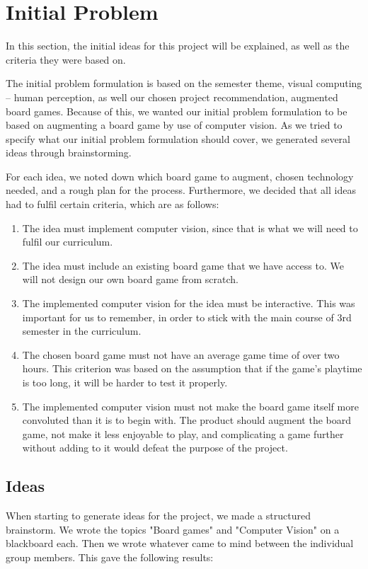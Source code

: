 \chapter{Initial Problem}\label{ch:iniprob}
In this section, the initial ideas for this project will be explained, as well as the criteria they were based on.

The initial problem formulation is based on the semester theme, visual computing -- human perception, as well our chosen project recommendation, augmented board games. Because of this, we wanted our initial problem formulation to be based on augmenting a board game by use of computer vision. As we tried to specify what our initial problem formulation should cover, we generated several ideas through brainstorming.

For each idea, we noted down which board game to augment, chosen technology needed, and a rough plan for the process. Furthermore, we decided that all ideas had to fulfil certain criteria, which are as follows:
\begin{enumerate}
	\item The idea must implement computer vision, since that is what we will need to fulfil our curriculum.
	\item The idea must include an existing board game that we have access to. We will not design our own board game from scratch.
	\item The implemented computer vision for the idea must be interactive. This was important for us to remember, in order to stick with the main course of 3rd semester in the curriculum.
	\item The chosen board game must not have an average game time of over two hours. This criterion was based on the assumption that if the game's playtime is too long, it will be harder to test it properly.
	\item The implemented computer vision must not make the board game itself more convoluted than it is to begin with. The product should augment the board game, not make it less enjoyable to play, and complicating a game further without adding to it would defeat the purpose of the project.
\end{enumerate}





\section{Ideas}\label{sec:idea}
When starting to generate ideas for the project, we made a structured brainstorm. We wrote the topics "Board games" and "Computer Vision" on a blackboard each. Then we wrote whatever came to mind between the individual group members. This gave the following results: 

